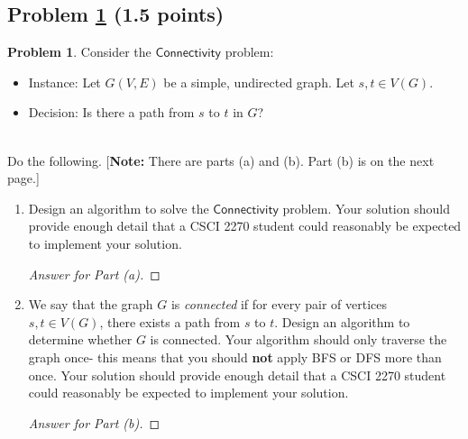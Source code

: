 \documentclass[11pt]{article}
\theoremstyle{definition}
\theoremstyle{definition}
\newtheorem{required}{Problem}
\theoremstyle{definition}
\begin{document}
\subsection{Problem \ref{DFS1} (1.5 points)}
\begin{required} \label{DFS1}
Consider the $\textsf{Connectivity}$ problem:
\begin{itemize}
\item \textsf{Instance:} Let $G(V, E)$ be a simple, undirected graph. Let $s, t \in V(G)$.
\item \textsf{Decision:} Is there a path from $s$ to $t$ in $G$?
\end{itemize}

\noindent \\ Do the following. [\textbf{Note:} There are parts (a) and (b). Part (b) is on the next page.]
\begin{enumerate}[label=(\alph*)]
\item Design an algorithm to solve the $\textsf{Connectivity}$ problem. Your solution should provide enough detail that a CSCI 2270 student could reasonably be expected to implement your solution.
\begin{proof}[Answer for Part (a)]
\end{proof}



\newpage
\item We say that the graph $G$ is \textit{connected} if for every pair of vertices $s, t \in V(G)$, there exists a path from $s$ to $t$. Design an algorithm to determine whether $G$ is connected. Your algorithm should only traverse the graph once- this means that you should \textbf{not} apply BFS or DFS more than once. Your solution should provide enough detail that a CSCI 2270 student could reasonably be expected to implement your solution.

\begin{proof}[Answer for Part (b)]
\end{proof}
\end{enumerate}
\end{required}






\newpage
\end{document}
